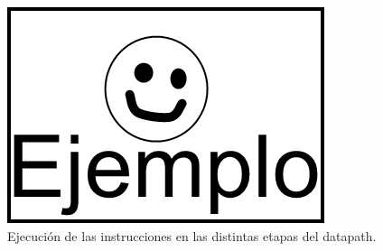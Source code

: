\begin{figure}[!ht]
	\centering
	\includegraphics[scale=0.4]{images/Ejemplo.png}
	\caption{Ejecución de las instrucciones en las distintas etapas del datapath.}
	\label{fig:ej}
\end{figure}
